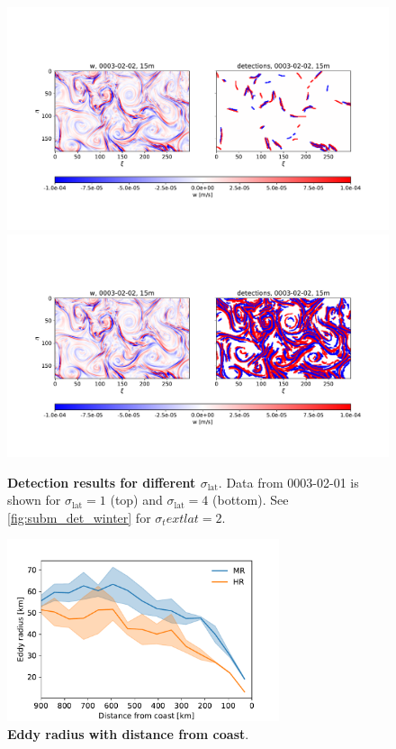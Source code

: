 \begin{figure}
    \centering
    \includegraphics[width=16cm, trim=2.5cm 0 0 2cm]{figures/eval_det_sig_sm.pdf}
    \includegraphics[width=16cm, trim=2.5cm 0 0 2cm]{figures/eval_det_sig_lg.pdf}
    \caption[Detection results for different $\sigma_\text{lat}$]{\textbf{Detection results for different $\sigma_\text{lat}$}. Data from 0003-02-01 is shown for $\sigma_\text{lat} = 1$ (top) and $\sigma_\text{lat} = 4$ (bottom). See \autoref{fig:subm_det_winter} for $\sigma_text{lat} = 2$.}\label{fig:subm_det_sigma}
\end{figure}

\begin{figure}
    \centering
    \includegraphics[width=8cm]{figures/result_eddies_d2c.pdf}
    \caption[Relative change of eddy radius with distance from coast]{\textbf{Eddy radius with distance from coast}.}
    \label{fig:meso_d2c}
\end{figure}

